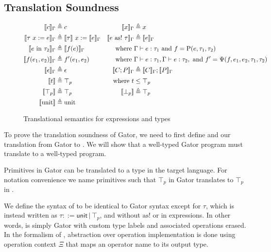 \documentclass[../main.tex]{subfiles}
\begin{document}
\subsection{Translation Soundness}
\begin{figure}
	\begin{align*}
		\llbracket c \rrbracket_\Gamma &\triangleq c &
		\llbracket x \rrbracket_\Gamma &\triangleq x \\
		\llbracket \tau\ x := e \rrbracket_\Gamma &\triangleq \llbracket \tau \rrbracket\ x := \llbracket e \rrbracket_\Gamma &
		\llbracket e\ \mathrm{as!}\ \tau \rrbracket_\Gamma&\triangleq \llbracket e \rrbracket_\Gamma \\
		\llbracket e\ \mathrm{in}\ \tau_2 \rrbracket_\Gamma&\triangleq \llbracket f(e) \rrbracket_\Gamma&\text{where }&\Gamma|-e:\tau_1\text{ and }f=\mathrm{P}(e,\tau_1,\tau_2)\\
		\llbracket f(e_1, e_2) \rrbracket_\Gamma&\triangleq f'(e_1, e_2)&\text{where }&\Gamma|-e:\tau_1,\Gamma|-e:\tau_2,\text{ and }f'=\Psi(f,e_1,e_2,\tau_1,\tau_2)\\
		\llbracket \epsilon \rrbracket_\Gamma&\triangleq \epsilon&
		\llbracket C;P \rrbracket_\Gamma&\triangleq\llbracket C \rrbracket_\Gamma;\llbracket P \rrbracket_\Gamma\\
		\llbracket t \rrbracket&\triangleq \top_p&\text{where }t&\leq\top_p\\
		\llbracket \top_p \rrbracket&\triangleq \top_p &
		\llbracket \bot_p \rrbracket&\triangleq \top_p \\
		\llbracket \textrm{unit} \rrbracket&\triangleq \textrm{unit}
	\end{align*}
	\caption{Translational semantics for expressions and types}
	\label{fig:translation}
\end{figure}

To prove the translation soundness of Gator, we need to first define \targlang and our translation from Gator to \targlang.
We will show that a well-typed Gator program must translate to a well-typed \targlang program. 

Primitives in Gator can be translated to a type in the target language. 
For notation convenience we name primitives such that $\top_p$ in Gator translates to $\top_p$ in \targlang.

We define the syntax of \targlang to be identical to Gator syntax except for $\tau$, which is instead written as $\tau::=\mathsf{unit}\,|\,\top_p$, and without $\textrm{as!}$ or $\textrm{in}$ expressions.
In other words, \targlang is simply Gator with custom type labels and associated operations erased.
In the formalism of \targlang, abstraction over operation implementation is done using operation context $\Xi$ that maps an operator name to its output type.
\end{document}
